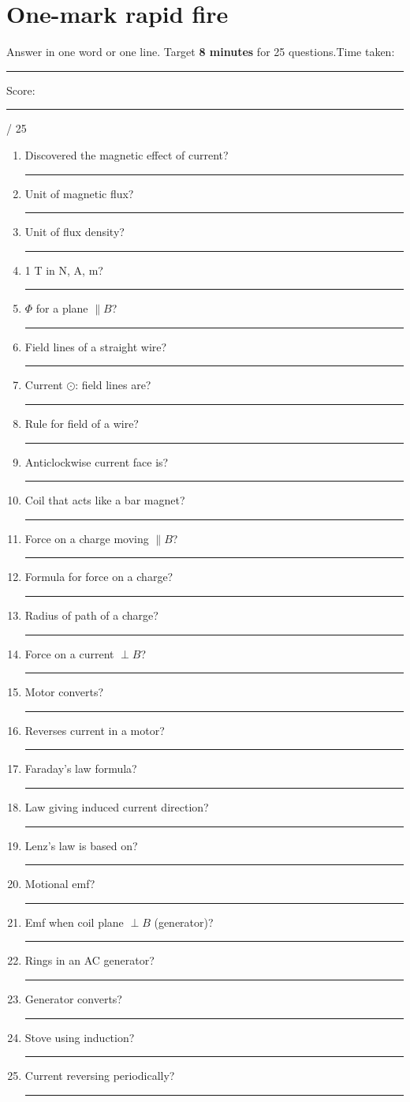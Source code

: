 \documentclass[11pt,a4paper]{article}
\newif\ifanswers
\newcommand{\blank}[2][2.8cm]{\ifanswers\leavevmode{\color{anscol}\bfseries\uline{#2}}\else\rule[-2pt]{#1}{0.5pt}\fi}
\begin{document}
\clearpage
\section*{\sffamily\color{ecblue}One-mark rapid fire}
{\small Answer in one word or one line. Target \textbf{8 minutes} for 25 questions.}\hfill Time taken: \rule{1.6cm}{0.3pt}\qquad Score: \rule{1cm}{0.3pt} / 25
\vspace{4pt}
\renewcommand{\arraystretch}{1.55}
\begin{multicols}{2}
\begin{enumerate}[itemsep=5pt]
\item Discovered the magnetic effect of current? \blank[2cm]{Oersted}
\item Unit of magnetic flux? \blank[2cm]{weber}
\item Unit of flux density? \blank[2cm]{tesla}
\item 1 T in N, A, m? \blank[2cm]{N/(A m)}
\item $\Phi$ for a plane $\parallel B$? \blank[2cm]{zero}
\item Field lines of a straight wire? \blank[2cm]{circles}
\item Current $\odot$: field lines are? \blank[2cm]{anticlockwise}
\item Rule for field of a wire? \blank[2cm]{thumb rule}
\item Anticlockwise current face is? \blank[2cm]{N pole}
\item Coil that acts like a bar magnet? \blank[2cm]{solenoid}
\item Force on a charge moving $\parallel B$? \blank[2cm]{zero}
\item Formula for force on a charge? \blank[2cm]{$qvB\sin\theta$}
\item Radius of path of a charge? \blank[2cm]{$mv/Bq$}
\item Force on a current $\perp B$? \blank[2cm]{$ILB$}
\item Motor converts? \blank[2cm]{elec.\ $\to$ mech.}
\item Reverses current in a motor? \blank[2cm]{split rings}
\item Faraday's law formula? \blank[2cm]{$\Delta\Phi/\Delta t$}
\item Law giving induced current direction? \blank[2cm]{Lenz's law}
\item Lenz's law is based on? \blank[2cm]{energy cons.}
\item Motional emf? \blank[2cm]{$Blv$}
\item Emf when coil plane $\perp B$ (generator)? \blank[2cm]{zero}
\item Rings in an AC generator? \blank[2cm]{slip rings}
\item Generator converts? \blank[2cm]{mech.\ $\to$ elec.}
\item Stove using induction? \blank[2cm]{induction stove}
\item Current reversing periodically? \blank[2cm]{AC}
\end{enumerate}
\end{multicols}
\end{document}
